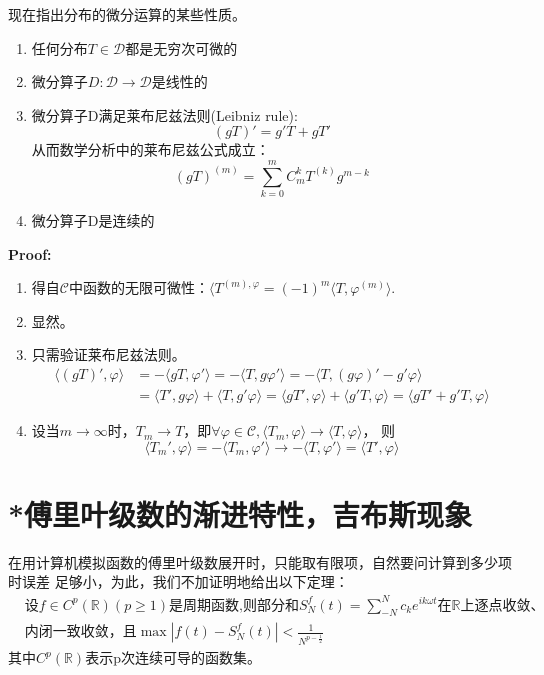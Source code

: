 \documentclass{ctexbook}
\begin{document}
现在指出分布的微分运算的某些性质。
\begin{enumerate}
    \item 任何分布$T\in\mathcal{D} $都是无穷次可微的
    \item 微分算子$D:\mathcal{D} \to\mathcal{D} $是线性的
    \item 微分算子D满足莱布尼兹法则(Leibniz rule):
          \[(gT)'=g'T+gT'\]从而数学分析中的莱布尼兹公式成立：
          \[(gT)^{(m)}=\sum_{k=0}^{m}C_m^k T^{(k)}g^{m-k}\]
    \item 微分算子D是连续的
\end{enumerate}
\textbf{Proof:}\begin{enumerate}
    \item 得自$\mathcal{C} $中函数的无限可微性：$\langle T^{(m),\varphi}=(-1)^m\langle T,\varphi^{(m)}\rangle$.
    \item 显然。
    \item 只需验证莱布尼兹法则。
          \begin{align*}
              \langle (gT)',\varphi\rangle & =-\langle gT,\varphi'\rangle=-\langle T,g\varphi'\rangle=-\langle T,(g\varphi)'-g'\varphi\rangle                                            \\
                                           & =\langle T',g\varphi\rangle+\langle T,g'\varphi\rangle=\langle gT',\varphi\rangle+\langle g'T,\varphi\rangle=\langle gT'+g'T,\varphi\rangle
          \end{align*}
    \item 设当$m\to\infty$时，$T_m\to T$，即$\forall\varphi\in\mathcal{C} ,\langle T_m,\varphi\rangle\to\langle T,\varphi\rangle$，
          则\[\langle T_m',\varphi\rangle=-\langle T_m,\varphi'\rangle\to-\langle T,\varphi'\rangle=\langle T',\varphi\rangle\]
\end{enumerate}

\section{*傅里叶级数的渐进特性，吉布斯现象}\label{sec:Asymptotic_Behaviour}

在用计算机模拟函数的傅里叶级数展开时，只能取有限项，自然要问计算到多少项时误差
足够小，为此，我们不加证明地给出以下定理：
\begin{align*}
     & \text{设}f\in C^p(\mathbb{R} )(p\geq1)\text{是周期函数,则部分和}
    S_N^f(t)=\sum_{-N}^{N}c_k e^{ik\omega t}
    \text{在}\mathbb{R} \text{上逐点收敛、}                                   \\
     & \text{内闭一致收敛，且} \max|f(t)-S_N^f(t)|<\frac{1}{N^{p-\frac{1}{2}}}
\end{align*}
其中$C^p(\mathbb{R} )$表示p次连续可导的函数集。
\end{document}
